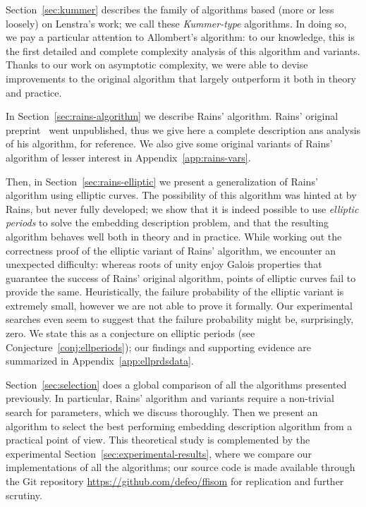 \documentclass[12pt]{article}
\theoremstyle{plain}
\theoremstyle{definition}
\newcounter{algorithm}
\begin{document}
Section~\ref{sec:kummer} describes the family of algorithms based
(more or less loosely) on Lenstra's work; we call these
\emph{Kummer-type} algorithms. %
In doing so, we pay a particular attention to Allombert's algorithm:
to our knowledge, this is the first detailed and complete complexity
analysis of this algorithm and variants. %
Thanks to our work on asymptotic complexity, we were able to devise
improvements to the original algorithm that largely outperform it both
in theory and practice. %

In Section~\ref{sec:rains-algorithm} we describe Rains' algorithm. %
Rains' original preprint~\cite{rains2008} went unpublished, thus we
give here a complete description ans analysis of his algorithm, for
reference. %
We also give some original variants of Rains' algorithm of lesser
interest in Appendix~\ref{app:rains-vars}.

Then, in Section~\ref{sec:rains-elliptic} we present a generalization
of Rains' algorithm using elliptic curves. %
The possibility of this algorithm was hinted at by Rains, but never
fully developed; we show that it is indeed possible to use
\emph{elliptic periods} to solve the embedding description problem,
and that the resulting algorithm behaves well both in theory and in
practice. %
While working out the correctness proof of the elliptic variant of
Rains' algorithm, we encounter an unexpected difficulty: whereas roots
of unity enjoy Galois properties that guarantee the success of Rains'
original algorithm, points of elliptic curves fail to provide the
same. %
Heuristically, the failure probability of the elliptic variant is
extremely small, however we are not able to prove it formally. %
Our experimental searches even seem to suggest that the failure
probability might be, surprisingly, zero. %
We state this as a conjecture on elliptic periods (see
Conjecture~\ref{conj:ellperiods}); our findings and supporting
evidence are summarized in Appendix~\ref{app:ellprdsdata}.

Section~\ref{sec:selection} does a global comparison of all the
algorithms presented previously. %
In particular, Rains' algorithm and variants require a non-trivial
search for parameters, which we discuss thoroughly. %
Then we present an algorithm to select the best performing embedding
description algorithm from a practical point of view. %
This theoretical study is complemented by the experimental
Section~\ref{sec:experimental-results}, where we compare our
implementations of all the algorithms; our source code is made
available through the Git repository
\url{https://github.com/defeo/ffisom} for replication and further
scrutiny.
\end{document}
